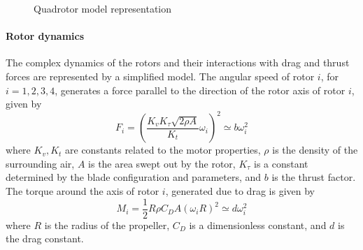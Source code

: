 \begin{figure}[h!]
	\centering
	\caption{Quadrotor model representation\label{fig:mod.model}}
\end{figure}	

\paragraph{Rotor dynamics}
The complex dynamics of the rotors and their interactions with drag and thrust forces are represented by a simplified model. 
The angular speed  of rotor $ i $, for $ i=1,2,3,4 $, generates a force  parallel to the direction of the rotor axis of rotor $ i $, given by
\begin{equation}\label{key}
F_i=\left( \frac{K_vK_\tau\sqrt{2\rho A}}{K_t}\omega_i\right)^2\simeq b\omega_i^2 
\end{equation}
where $ K_v,K_t $ are constants related to the motor properties, $ \rho $ is the density of the surrounding air, $ A $ is the area swept out by the rotor, $ K_\tau $ is a constant determined by the blade configuration and parameters, and $ b $ is the thrust factor.\\
The torque around the axis of rotor $ i $, generated due to drag is given by
\begin{equation}\label{key}
M_{i}=\frac{1}{2}R\rho C_DA(\omega_iR)^2\simeq d\omega_i^2
\end{equation}
where $ R $ is the radius of the propeller, $ C_D $ is a dimensionless constant, and $ d $ is the drag constant.

